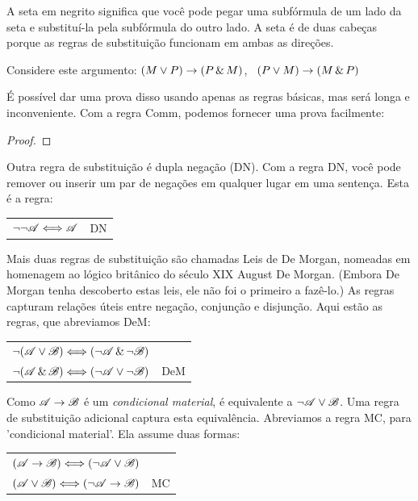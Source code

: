 A seta em negrito significa que você pode pegar uma subfórmula de um lado da seta e substituí-la pela subfórmula do outro lado. A seta é de duas cabeças porque as regras de substituição funcionam em ambas as direções.

Considere este argumento: $(M \vee P) \rightarrow (P \,\&\, M)$, \therefore\ $(P \vee M) \rightarrow (M \,\&\, P)$

É possível dar uma prova disso usando apenas as regras básicas, mas será longa e inconveniente. Com a regra Comm, podemos fornecer uma prova facilmente:

\begin{proof}
\end{proof}

Outra regra de substituição é dupla negação (DN). Com a regra DN, você pode remover ou inserir um par de negações em qualquer lugar em uma sentença. Esta é a regra:

\begin{center}
\begin{tabular}{rl}
$\neg\neg\mathscr{A} \Longleftrightarrow \mathscr{A}$ & DN
\end{tabular}
\end{center}

Mais duas regras de substituição são chamadas Leis de De Morgan, nomeadas em homenagem ao lógico britânico do século XIX August De Morgan. (Embora De Morgan tenha descoberto estas leis, ele não foi o primeiro a fazê-lo.) As regras capturam relações úteis entre negação, conjunção e disjunção. Aqui estão as regras, que abreviamos DeM:

\begin{center}
\begin{tabular}{rl}
$\neg(\mathscr{A}\vee\mathscr{B}) \Longleftrightarrow (\neg\mathscr{A}\,\&\,\neg\mathscr{B})$\\
$\neg(\mathscr{A}\,\&\,\mathscr{B}) \Longleftrightarrow (\neg\mathscr{A}\vee\neg\mathscr{B})$
& DeM
\end{tabular}
\end{center}

Como $\mathscr{A}\rightarrow\mathscr{B}$ é um \emph{condicional material}, é equivalente a $\neg\mathscr{A}\vee\mathscr{B}$. Uma regra de substituição adicional captura esta equivalência. Abreviamos a regra MC, para 'condicional material'. Ela assume duas formas:

\begin{center}
\begin{tabular}{rl}
$(\mathscr{A}\rightarrow\mathscr{B}) \Longleftrightarrow (\neg\mathscr{A}\vee\mathscr{B})$ &\\
$(\mathscr{A}\vee\mathscr{B}) \Longleftrightarrow (\neg\mathscr{A}\rightarrow\mathscr{B})$ & MC
\end{tabular}
\end{center}

